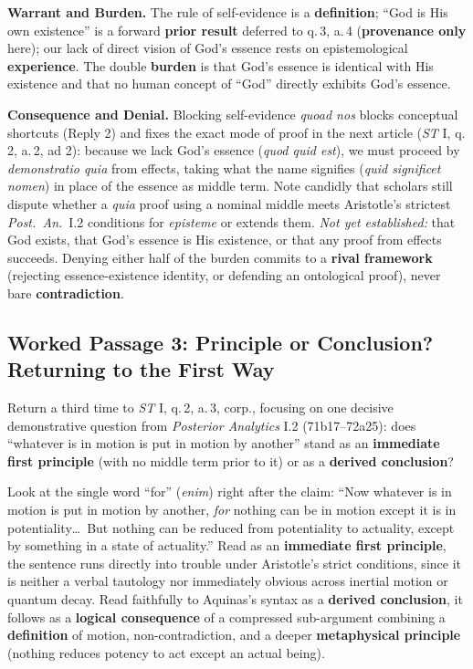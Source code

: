 \textbf{Warrant and Burden.} The rule of self-evidence is a \textbf{definition}; ``God is His own existence'' is a forward \textbf{prior result} deferred to q.\,3, a.\,4 (\textbf{provenance only} here); our lack of direct vision of God's essence rests on epistemological \textbf{experience}. The double \textbf{burden} is that God's essence is identical with His existence and that no human concept of ``God'' directly exhibits God's essence.

\textbf{Consequence and Denial.} Blocking self-evidence \emph{quoad nos} blocks conceptual shortcuts (Reply 2) and fixes the exact mode of proof in the next article (\emph{ST} I, q.\,2, a.\,2, ad 2): because we lack God's essence (\emph{quod quid est}), we must proceed by \emph{demonstratio quia} from effects, taking what the name signifies (\emph{quid significet nomen}) in place of the essence as middle term. Note candidly that scholars still dispute whether a \emph{quia} proof using a nominal middle meets Aristotle's strictest \emph{Post.\ An.}\ I.2 conditions for \emph{episteme} or extends them. \emph{Not yet established:} that God exists, that God's essence is His existence, or that any proof from effects succeeds. Denying either half of the burden commits to a \textbf{rival framework} (rejecting essence-existence identity, or defending an ontological proof), never bare \textbf{contradiction}.

\subsection{Worked Passage 3: Principle or Conclusion? Returning to the First Way}

Return a third time to \emph{ST} I, q.\,2, a.\,3, corp., focusing on one decisive demonstrative question from \emph{Posterior Analytics} I.2 (71b17--72a25): does ``whatever is in motion is put in motion by another'' stand as an \textbf{immediate first principle} (with no middle term prior to it) or as a \textbf{derived conclusion}?

Look at the single word ``for'' (\emph{enim}) right after the claim: ``Now whatever is in motion is put in motion by another, \emph{for} nothing can be in motion except it is in potentiality\dots\ But nothing can be reduced from potentiality to actuality, except by something in a state of actuality.'' Read as an \textbf{immediate first principle}, the sentence runs directly into trouble under Aristotle's strict conditions, since it is neither a verbal tautology nor immediately obvious across inertial motion or quantum decay. Read faithfully to Aquinas's syntax as a \textbf{derived conclusion}, it follows as a \textbf{logical consequence} of a compressed sub-argument combining a \textbf{definition} of motion, non-contradiction, and a deeper \textbf{metaphysical principle} (nothing reduces potency to act except an actual being).


